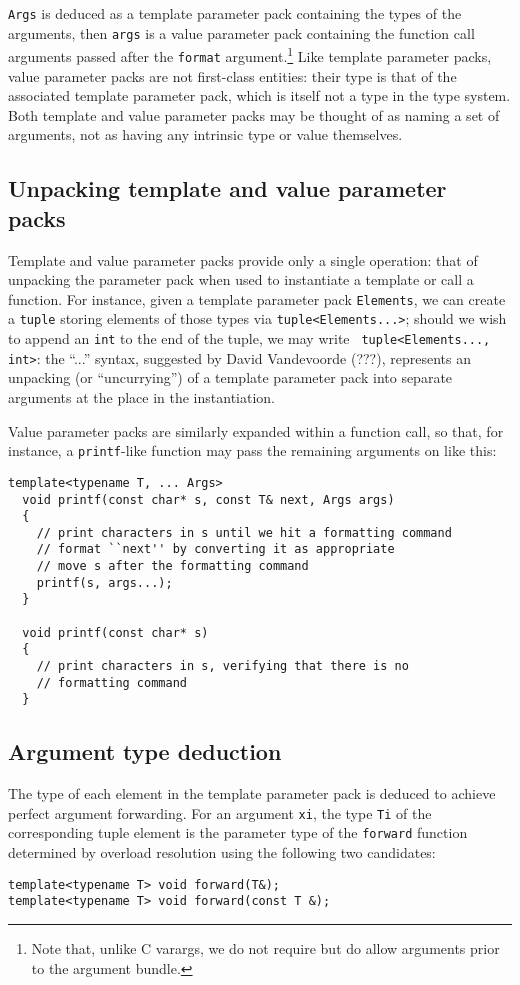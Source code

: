 \documentclass{article}
\begin{document}
{\tt Args} is deduced as a template parameter pack containing the types of
the arguments, then {\tt args} is a value parameter pack containing
the function call arguments passed after the {\tt format}
argument.\footnote{Note that, unlike C varargs, we do not require but
  do allow arguments prior to the argument bundle.} Like template
parameter packs, value parameter packs are not first-class entities:
their type is that of the associated template parameter pack, which is
itself not a type in the type system. Both template and value
parameter packs may be thought of as naming a set of arguments, not as
having any intrinsic type or value themselves.

\subsection{Unpacking template and value parameter packs}
Template and value parameter packs provide only a single operation:
that of unpacking the parameter pack when used to instantiate a
template or call a function. For instance, given a template parameter
pack {\tt Elements}, we can create a {\tt tuple} storing elements of
those types via {\tt tuple<Elements...>}; should we wish to append an
{\tt int} to the end of the tuple, we may write {\tt
  tuple<Elements..., int>}: the ``...'' syntax, suggested
by David Vandevoorde (???), represents an unpacking (or
``uncurrying'') of a template parameter pack into separate
arguments at the place in the instantiation.

Value parameter packs are similarly expanded within a function call,
so that, for instance, a {\tt printf}-like function may pass the
remaining arguments on like this:
\begin{verbatim}
template<typename T, ... Args>
  void printf(const char* s, const T& next, Args args)
  {
    // print characters in s until we hit a formatting command
    // format ``next'' by converting it as appropriate
    // move s after the formatting command
    printf(s, args...);
  }

  void printf(const char* s)
  {
    // print characters in s, verifying that there is no 
    // formatting command
  }
\end{verbatim}

\subsection{Argument type deduction}
The type of each element in the template parameter pack is deduced to
achieve perfect argument forwarding. For an argument {\tt xi}, the
type {\tt Ti} of the corresponding tuple element is the parameter type
of the {\tt forward} function determined by overload resolution using
the following two candidates:
\begin{verbatim}
template<typename T> void forward(T&);
template<typename T> void forward(const T &);
\end{verbatim}
\end{document}
